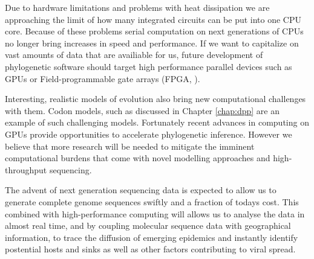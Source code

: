 Due to hardware limitations and problems with heat dissipation we are approaching the limit of how many integrated circuits can be put into one CPU core.
Because of these problems serial computation on next generations of CPUs no longer bring increases in speed and performance.
If we want to capitalize on vast amounts of data that are availiable for us, future development of phylogenetic software should target high performance parallel devices such as GPUs \citep{Nickolls2008} or Field-programmable gate arrays (FPGA, \citet{Kuon2008}).

Interesting, realistic models of evolution also bring new computational challenges with them.
Codon models, such as discussed in Chapter \ref{chap:dpp} are an example of such challenging models.
Fortunately recent advances in computing on GPUs \citep{Ayres2012} provide opportunities to accelerate phylogenetic inference.
However we believe that more research will be needed to mitigate the imminent computational burdens that come with novel modelling approaches and high-throughput sequencing. 

The advent of next generation sequencing data is expected to allow us to generate complete genome sequences swiftly and a fraction of todays cost.
This combined with high-performance computing will allows us to analyse the data in almost real time, and by coupling molecular sequence data with geographical information, to trace the diffusion of emerging epidemics and instantly identify postential hosts and sinks as well as other factors contributing to viral spread.   


